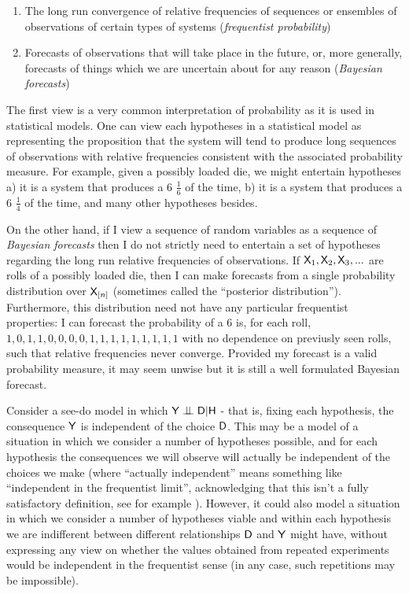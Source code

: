 \begin{enumerate}
    \item The long run convergence of relative frequencies of sequences or ensembles of observations of certain types of systems (\emph{frequentist probability})
    \item Forecasts of observations that will take place in the future, or, more generally, forecasts of things which we are uncertain about for any reason (\emph{Bayesian forecasts})
\end{enumerate}

The first view is a very common interpretation of probability as it is used in statistical models. One can view each hypotheses in a statistical model as representing the proposition that the system will tend to produce long sequences of observations with relative frequencies consistent with the associated probability measure. For example, given a possibly loaded die, we might entertain hypotheses a) it is a system that produces a 6 $\frac{1}{6}$ of the time, b) it is a system that produces a 6 $\frac{1}{4}$ of the time, and many other hypotheses besides. 

On the other hand, if I view a sequence of random variables as a sequence of \emph{Bayesian forecasts} then I do not strictly need to entertain a set of hypotheses regarding the long run relative frequencies of observations. If $\mathsf{X}_1,\mathsf{X}_2,\mathsf{X}_3,...$ are rolls of a possibly loaded die, then I can make forecasts from a single probability distribution over $\mathsf{X}_{[n]}$ (sometimes called the ``posterior distribution''). Furthermore, this distribution need not have any particular frequentist properties: I can forecast the probability of a $6$ is, for each roll, $1,0,1,1,0,0,0,0,1,1,1,1,1,1,1,1,1$ with no dependence on previusly seen rolls, such that relative frequencies never converge. Provided my forecast is a valid probability measure, it may seem unwise but it is still a well formulated Bayesian forecast.

Consider a see-do model in which $\RV{Y}\CI\RV{D}|\RV{H}$ - that is, fixing each hypothesis, the consequence $\mathsf{Y}$ is independent of the choice $\mathsf{D}$. This may be a model of a situation in which we consider a number of hypotheses possible, and for each hypothesis the consequences we will observe will actually be independent of the choices we make (where ``actually independent'' means something like ``independent in the frequentist limit'', acknowledging that this isn't a fully satisfactory definition, see for example \citet{hajek_interpretations_2019}).  However, it could also model a situation in which we consider a number of hypotheses viable and within each hypothesis we are indifferent between different relationships $\mathsf{D}$ and $\mathsf{Y}$ might have, without expressing any view on whether the values obtained from repeated experiments would be independent in the frequentist sense (in any case, such repetitions may be impossible).

